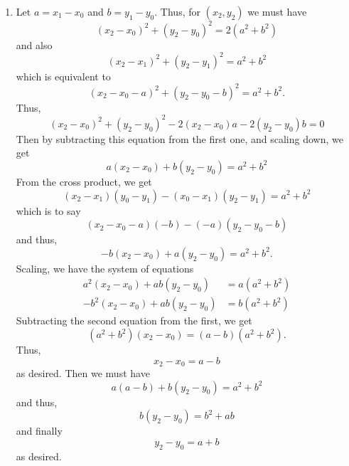 \documentclass[12 pt, letterpaper]{hmcpset}
\begin{document}
\begin{solution}
\begin{enumerate}
			The area of the square is the square of the side --- $n = a^{2} + b^{2}$.
		\item Let $a = x_{1} - x_{0}$ and $b = y_{1} - y_{0}$. Thus, for $(x_{2}, y_{2})$ we must have
			\[
				(x_2 - x_{0})^{2} + (y_{2} - y_{0})^{2} = 2(a^{2} + b^{2})
			\]
			and also
			\[
				(x_{2} - x_{1})^{2} + (y_{2} - y_{1})^{2} = a^{2} + b^{2}
			\]
			which is equivalent to
			\[
				(x_{2} - x_{0} - a)^{2} + (y_{2} - y_{0} - b)^{2} = a^{2} + b^{2}.
			\]
			Thus,
			\[
				(x_{2} - x_{0})^{2} + (y_{2} - y_{0})^{2} -  2 (x_{2} - x_{0}) a - 2(y_{2} - y_{0}) b = 0
			\]
			Then by subtracting this equation from the first one, and scaling down, we get
			\[
				a (x_{2} - x_{0}) + b (y_{2} - y_{0}) = a^{2} + b^{2}
			\]
			From the cross product, we get
			\[
				(x_{2} - x_{1})(y_{0} - y_{1}) - (x_{0} - x_{1})(y_{2} - y_{1}) = a^{2} + b^{2}
			\]
			which is to say
			\[
				(x_{2} - x_{0} - a)(-b) - (-a)(y_{2} - y_{0} - b)
			\]
			and thus,
			\[
				- b (x_{2} - x_{0}) + a(y_{2} - y_{0}) = a^{2} + b^{2}.
			\]
			Scaling, we have the system of equations
			\[
				\begin{split}
					a^{2} (x_{2} - x_{0}) + ab (y_{2} - y_{0}) & = a(a^{2} + b^{2}) \\
					-b^{2} (x_{2} - x_{0}) + ab (y_{2} - y_{0}) & = b(a^{2} + b^{2})
				\end{split}
			\]
			Subtracting the second equation from the first, we get
			\[
				(a^{2} + b^{2}) (x_{2} - x_{0}) = (a - b)(a^{2} + b^{2}).
			\]
			Thus,
			\[
				x_{2} - x_{0} = a - b
			\]
			as desired. Then we must have
			\[
				a(a - b) + b(y_{2} - y_{0}) = a^{2} + b^{2}
			\]
			and thus,
			\[
				b(y_{2} - y_{0}) = b^{2} + ab
			\]
			and finally
			\[
				y_{2} - y_{0} = a + b
			\]
			as desired.


\end{enumerate}
\end{solution}
\end{document}
